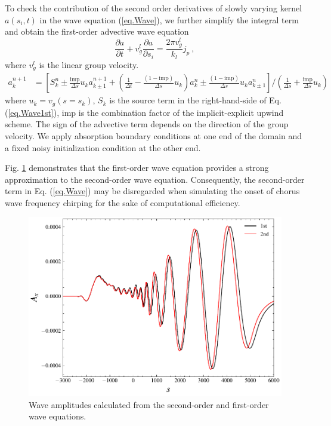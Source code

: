 To check the contribution of the second order derivatives of slowly varying kernel $a(s_i,t)$ in the wave equation (\ref{eq.Wave}), we further simplify the integral term and obtain the first-order advective wave equation 
\begin{equation}\label{eq.Wave1st}
    \frac{\partial a}{\partial t} + v^l_{g} \frac{\partial a}{\partial s_i} = \frac{2\pi v^l_g}{k_l} j_{p}~,
\end{equation}
where $v_g^l$ is the linear group velocity.
\begin{equation}
    \begin{aligned}
    a^{n+1}_k &= \left[ S_k^n \pm  \frac{\mathrm{imp}}{\Delta s}  {u_k} a_{k\pm1}^{n+1} + \left(\frac{1}{\Delta t} - \frac{(1- \mathrm{imp})}{\Delta s} u_k\right)  a_{k}^{n} \pm  \frac{(1-\mathrm{imp})}{\Delta s} u_k a_{k \pm 1}^{n} \right]/\left(\frac{1}{\Delta s} + \frac{\mathrm{imp}}{\Delta s}u_k\right)
    \end{aligned}
\end{equation}
where $u_k = v_g(s=s_k)$, $S_k$ is the source term in the right-hand-side of Eq. (\ref{eq.Wave1st}), $\mathrm{imp}$ is the combination factor of the implicit-explicit upwind scheme. 
The sign of the advective term depends on the direction of the group velocity. We apply absorption boundary conditions at one end of the domain and a fixed noisy initialization condition at the other end.

Fig. \ref{fig.cmp2} demonstrates that the first-order wave equation provides a strong approximation to the second-order wave equation. Consequently, the second-order term in Eq. (\ref{eq.Wave}) may be disregarded when simulating the onset of chorus wave frequency chirping for the sake of computational efficiency.
\begin{figure}[htbp]
    \centering
    \includegraphics[scale=0.5]{cpc_img/fig_diff.pdf}
    \caption{ Wave amplitudes calculated from the second-order and first-order wave equations. 
    }
    \label{fig.cmp2}
\end{figure}
